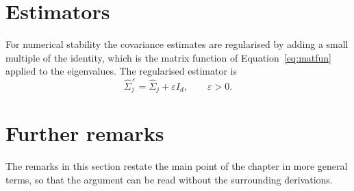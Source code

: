 \lipsum[23-24]

\section{Estimators}\label{sec:estimators}

For numerical stability the covariance estimates are regularised by adding a
small multiple of the identity, which is the matrix function
of Equation~\eqref{eq:matfun} applied to the eigenvalues. The regularised
estimator is
\begin{equation}\label{eq:reg}
  \widehat{\Sigma}_j^{\,\varepsilon} = \widehat{\Sigma}_j + \varepsilon I_d ,
  \qquad \varepsilon > 0 .
\end{equation}

\lipsum[25-26]

\section{Further remarks}\label{sec:further-estimation}

The remarks in this section restate the main point of the chapter in more
general terms, so that the argument can be read without the surrounding
derivations.

\lipsum[87-98]
